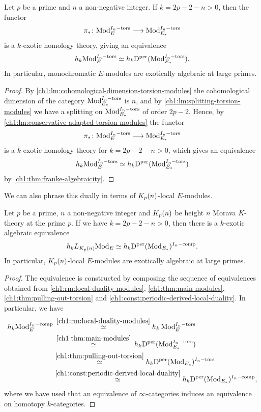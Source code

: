 \begin{theorem}
    \label{ch1:thm:main-modules}
    Let $p$ be a prime and $n$ a non-negative integer. If $k=2p-2-n>0$, then the functor 
    \[\pi_*\colon \mathrm{Mod}_{E}^{I_n-\mathrm{tors}}\longrightarrow\mathrm{Mod}_{E_*}^{I_n-\mathrm{tors}}\]
    is a $k$-exotic homology theory, giving an equivalence 
    \[h_k \mathrm{Mod}_{E}^{I_n-\mathrm{tors}} \simeq h_k \mathrm{D}^{\mathrm{per}}(\mathrm{Mod}_{E_*}^{I_n-\mathrm{tors}}).\]
    In particular, monochromatic $E$-modules are exotically algebraic at large primes. 
\end{theorem}
\begin{proof}
    By \cref{ch1:lm:cohomological-dimension-torsion-modules} the cohomological dimension of the category $\mathrm{Mod}_{E_*}^{I_n-\mathrm{tors}}$ is $n$, and by \cref{ch1:lm:splitting-torsion-modules} we have a splitting on $\mathrm{Mod}_{E_*}^{I_n-\mathrm{tors}}$ of order $2p-2$. Hence, by \cref{ch1:lm:conservative-adapted-torsion-modules} the functor $$\pi_*\colon \mathrm{Mod}_{E}^{I_n-\mathrm{tors}} \longrightarrow \mathrm{Mod}_{E_*}^{I_n-\mathrm{tors}}$$
    is a $k$-exotic homology theory for $k=2p-2-n>0$, which gives an equivalence 
    \[h_k \mathrm{Mod}_{E}^{I_n-\mathrm{tors}} \simeq h_k \mathrm{D}^{\mathrm{per}}(\mathrm{Mod}_{E_*}^{I_n-\mathrm{tors}})\]
    by \cref{ch1:thm:franke-algebraicity}.
\end{proof}

We can also phrase this dually in terms of ${K_p(n)}$-local $E$-modules. 

\begin{corollary}
    \label{ch1:cor:main-modules-dual}
    Let $p$ be a prime, $n$ a non-negative integer and ${K_p(n)}$ be height $n$ Morava $K$-theory at the prime $p$. If we have $k=2p-2-n>0$, then there is a $k$-exotic algebraic equivalence 
    \[h_k L_{{K_p(n)}}\mathrm{Mod}_{E} \simeq h_k \mathrm{D}^{\mathrm{per}}(\mathrm{Mod}_{E_*})^{I_n-\mathrm{comp}}.\]
    In particular, ${K_p(n)}$-local $E$-modules are exotically algebraic at large primes. 
\end{corollary}
\begin{proof}
    The equivalence is constructed by composing the sequence of equivalences obtained from \cref{ch1:rm:local-duality-modules}, \cref{ch1:thm:main-modules}, \cref{ch1:thm:pulling-out-torsion} and \cref{ch1:const:periodic-derived-local-duality}. In particular, we have
    \begin{align*}
        h_k \mathrm{Mod}_{E}^{I_n-\mathrm{comp}}
        &\hspace{2pt}\overset{\ref{ch1:rm:local-duality-modules}}\simeq 
        h_k \hspace{2pt} \mathrm{Mod}_{E}^{I_n-\mathrm{tors}} \\
        &\hspace{2pt}\overset{\ref{ch1:thm:main-modules}}\simeq 
        \hspace{2pt} h_k \mathrm{D}^{\mathrm{per}}(\mathrm{Mod}_{E_*}^{I_n-\mathrm{tors}}) \\
        &\overset{\ref{ch1:thm:pulling-out-torsion}}\simeq
        h_k \mathrm{D}^{\mathrm{per}}(\mathrm{Mod}_{E_*})^{I_n-\mathrm{tors}} \\
        &\overset{\ref{ch1:const:periodic-derived-local-duality}}\simeq 
        h_k \mathrm{D}^{\mathrm{per}}(\mathrm{Mod}_{E_*})^{I_n-\mathrm{comp}},
    \end{align*}
    where we have used that an equivalence of $\infty$-categories induces an equivalence on homotopy $k$-categories.
\end{proof}


